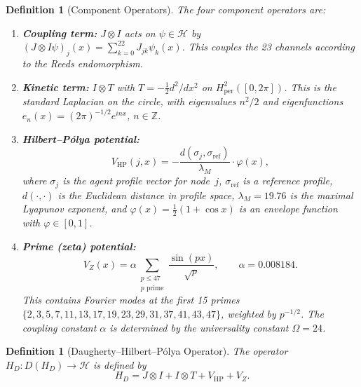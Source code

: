 \documentclass[11pt,a4paper]{article}
\theoremstyle{plain}
\newtheorem{definition}[theorem]{Definition}
\theoremstyle{remark}
\newcommand{\Z}{\mathbb{Z}}
\newcommand{\HH}{\mathcal{H}}
\begin{document}
\begin{definition}[Component Operators]\label{def:components}
The four component operators are:
\begin{enumerate}[label=(\alph*),nosep]
  \item \textbf{Coupling term:} $J\otimes I$ acts on $\psi\in\HH$ by
        $(J\otimes I\psi)_j(x)=\sum_{k=0}^{22}J_{jk}\psi_k(x)$.
        This couples the 23 channels according to the Reeds endomorphism.

  \item \textbf{Kinetic term:} $I\otimes T$ with $T=-\tfrac{1}{2}d^2/dx^2$
        on $H^2_{\mathrm{per}}([0,2\pi])$.  This is the standard
        Laplacian on the circle, with eigenvalues $n^2/2$ and
        eigenfunctions $e_n(x)=(2\pi)^{-1/2}e^{inx}$, $n\in\Z$.

  \item \textbf{Hilbert--P\'olya potential:}
        \begin{equation}\label{eq:VHP}
          V_{\mathrm{HP}}(j,x)=-\frac{d(\sigma_j,\sigma_{\mathrm{ref}})}
          {\lambda_M}\cdot\varphi(x),
        \end{equation}
        where $\sigma_j$ is the agent profile vector for node~$j$,
        $\sigma_{\mathrm{ref}}$ is a reference profile,
        $d(\cdot,\cdot)$ is the Euclidean distance in profile space,
        $\lambda_M=19.76$ is the maximal Lyapunov exponent, and
        $\varphi(x)=\tfrac{1}{2}(1+\cos x)$ is an envelope function
        with $\varphi\in[0,1]$.

  \item \textbf{Prime (zeta) potential:}
        \begin{equation}\label{eq:VZ}
          V_Z(x)=\alpha\sum_{\substack{p\leq 47\\p\text{ prime}}}
          \frac{\sin(px)}{\sqrt{p}},\qquad\alpha=0.008184.
        \end{equation}
        This contains Fourier modes at the first 15 primes
        $\{2,3,5,7,11,13,17,19,23,29,31,37,41,43,47\}$, weighted by
        $p^{-1/2}$.  The coupling constant $\alpha$ is determined by
        the universality constant $\Omega=24$.
\end{enumerate}
\end{definition}

\begin{definition}[Daugherty--Hilbert--P\'olya Operator]\label{def:HD}
The operator $H_D\colon D(H_D)\to\HH$ is defined by
\begin{equation}\label{eq:HD}
  H_D = J\otimes I + I\otimes T + V_{\mathrm{HP}} + V_Z.
\end{equation}
\end{definition}
\end{document}
